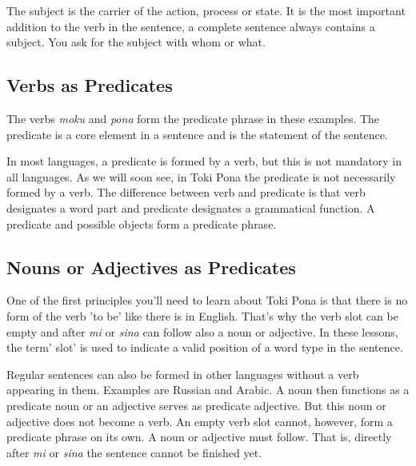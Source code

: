 The subject is the carrier of the action, process or state. 
It is the most important addition to the verb in the sentence, a complete sentence always contains a subject. 
You ask for the subject with whom or what.

%
\subsection*{Verbs as Predicates}
%

The verbs \textit{moku} and \textit{pona} form the predicate phrase in these examples.  
The predicate is a core element in a sentence and is the statement of the sentence. 

In most languages, a predicate is formed by a verb, but this is not mandatory in all languages. 
As we will soon see, in Toki Pona the predicate is not necessarily formed by a verb. 
The difference between verb and predicate is that verb designates a word part and predicate designates a grammatical function.
A predicate and possible objects form a predicate phrase. 
%
\subsection*{Nouns or Adjectives as Predicates}
%
%
%
One of the first principles you'll need to learn about Toki Pona is that there is no form of the verb 'to be' like there is in English. 
That's why the verb slot can be empty and after \textit{mi} or \textit{sina} can follow also a noun or adjective. 
In these lessons, the term' slot' is used to indicate a valid position of a word type in the sentence.


Regular sentences can also be formed in other languages without a verb appearing in them. 
Examples are Russian and Arabic. 
A noun then functions as a predicate noun or an adjective serves as predicate adjective.
But this noun or adjective does not become a verb. 
An empty verb slot cannot, however, form a predicate phrase on its own. 
A noun or adjective must follow. 
That is, directly after \textit{mi} or \textit{sina} the sentence cannot be finished yet.

